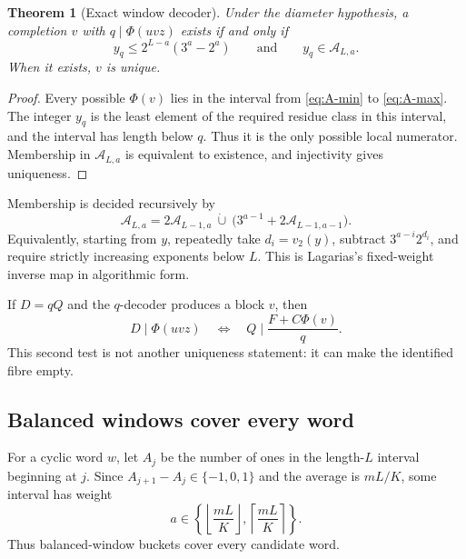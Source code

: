 \documentclass[11pt]{amsart}
\numberwithin{equation}{section}
\newtheorem{theorem}{Theorem}[section]
\newcommand{\A}{\mathcal A}
\begin{document}
\begin{theorem}[Exact window decoder]\label{thm:exact-decoder}
Under the diameter hypothesis, a completion $v$ with $q\mid\Phi(uvz)$ exists if and only if
\begin{equation}\label{eq:decoder-test}
y_q\le2^{L-a}(3^a-2^a)
\qquad\text{and}\qquad
y_q\in\A_{L,a}.
\end{equation}
When it exists, $v$ is unique.
\end{theorem}

\begin{proof}
Every possible $\Phi(v)$ lies in the interval from \eqref{eq:A-min} to \eqref{eq:A-max}.  The integer $y_q$ is the least element of the required residue class in this interval, and the interval has length below $q$.  Thus it is the only possible local numerator.  Membership in $\A_{L,a}$ is equivalent to existence, and injectivity gives uniqueness.
\end{proof}

Membership is decided recursively by
\begin{equation}\label{eq:A-recursion}
\A_{L,a}
=2\A_{L-1,a}\ \dot\cup\ 
\bigl(3^{a-1}+2\A_{L-1,a-1}\bigr).
\end{equation}
Equivalently, starting from $y$, repeatedly take $d_i=v_2(y)$, subtract $3^{a-i}2^{d_i}$, and require strictly increasing exponents below $L$.  This is Lagarias's fixed-weight inverse map in algorithmic form.

If $D=qQ$ and the $q$-decoder produces a block $v$, then
\begin{equation}\label{eq:cofactor-test}
D\mid\Phi(uvz)
\quad\Longleftrightarrow\quad
Q\mid\frac{F+C\Phi(v)}q.
\end{equation}
This second test is not another uniqueness statement: it can make the identified fibre empty.

\subsection{Balanced windows cover every word}

For a cyclic word $w$, let $A_j$ be the number of ones in the length-$L$ interval beginning at $j$.  Since $A_{j+1}-A_j\in\{-1,0,1\}$ and the average is $mL/K$, some interval has weight
\begin{equation}\label{eq:balanced-weight}
a\in\left\{\left\lfloor\frac{mL}{K}\right\rfloor,
\left\lceil\frac{mL}{K}\right\rceil\right\}.
\end{equation}
Thus balanced-window buckets cover every candidate word.
\end{document}
